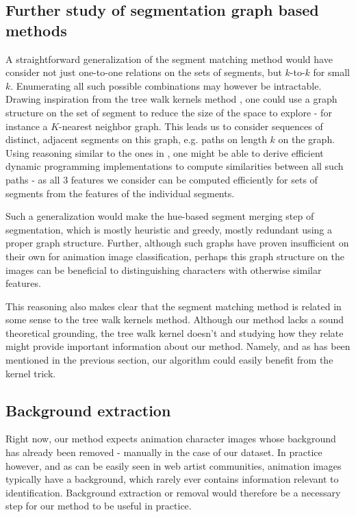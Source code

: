 \subsection{Further study of segmentation graph based methods}
\label{sec:extensionSegGraph}
A straightforward generalization of the segment matching method would have consider not just one-to-one relations on the sets of segments, but $k$-to-$k$ for small $k$. Enumerating all such possible combinations may however be intractable. Drawing inspiration from the tree walk kernels method \cite{harchaoui2007image}, one could use a graph structure on the set of segment to reduce the size of the space to explore - for instance a $K$-nearest neighbor graph. This leads us to consider sequences of distinct, adjacent segments on this graph, e.g. paths on length $k$ on the graph. Using reasoning similar to the ones in \cite{harchaoui2007image}, one might be able to derive efficient dynamic programming implementations to compute similarities between all such paths - as all $3$ features we consider can be computed efficiently for sets of segments from the features of the individual segments.

Such a generalization would make the hue-based segment merging step of segmentation, which is mostly heuristic and greedy, mostly redundant using a proper graph structure. Further, although such graphs have proven insufficient on their own for animation image classification, perhaps this graph structure on the images can be beneficial to distinguishing characters with otherwise similar features.

This reasoning also makes clear that the segment matching method is related in some sense to the tree walk kernels method. Although our method lacks a sound theoretical grounding, the tree walk kernel doesn't and studying how they relate might provide important information about our method. Namely, and as has been mentioned in the previous section, our algorithm could easily benefit from the kernel trick.

\subsection{Background extraction}
Right now, our method expects animation character images whose background has already been removed - manually in the case of our dataset. In practice however, and as can be easily seen in web artist communities, animation images typically have a background, which rarely ever contains information relevant to identification. Background extraction or removal would therefore be a necessary step for our method to be useful in practice.


